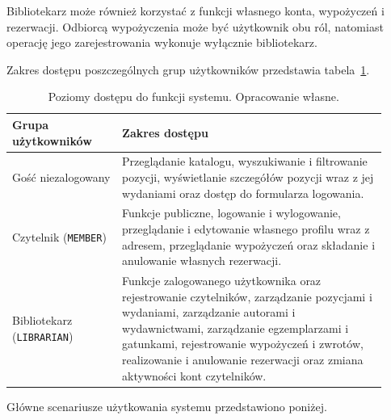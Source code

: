 \documentclass[11pt, a4paper]{article}
\begin{document}
Bibliotekarz może również korzystać z funkcji własnego konta, wypożyczeń i rezerwacji. Odbiorcą wypożyczenia może być użytkownik obu ról, natomiast operację jego zarejestrowania wykonuje wyłącznie bibliotekarz.

Zakres dostępu poszczególnych grup użytkowników przedstawia tabela~\ref{tab:poziomy-dostepu}.

\begin{table}[htbp]
\centering
\caption{Poziomy dostępu do funkcji systemu. Opracowanie własne.}
\label{tab:poziomy-dostepu}
\begin{tabular}{@{}p{0.27\linewidth}p{0.65\linewidth}@{}}
\toprule
\textbf{Grupa użytkowników} & \textbf{Zakres dostępu} \\
\midrule
Gość niezalogowany & Przeglądanie katalogu, wyszukiwanie i filtrowanie pozycji, wyświetlanie szczegółów pozycji wraz z jej wydaniami oraz dostęp do formularza logowania. \\
Czytelnik (\texttt{MEMBER}) & Funkcje publiczne, logowanie i wylogowanie, przeglądanie i edytowanie własnego profilu wraz z adresem, przeglądanie wypożyczeń oraz składanie i anulowanie własnych rezerwacji. \\
Bibliotekarz (\texttt{LIBRARIAN}) & Funkcje zalogowanego użytkownika oraz rejestrowanie czytelników, zarządzanie pozycjami i wydaniami, zarządzanie autorami i wydawnictwami, zarządzanie egzemplarzami i gatunkami, rejestrowanie wypożyczeń i zwrotów, realizowanie i anulowanie rezerwacji oraz zmiana aktywności kont czytelników. \\
\bottomrule
\end{tabular}
\end{table}

Główne scenariusze użytkowania systemu przedstawiono poniżej.
\end{document}
